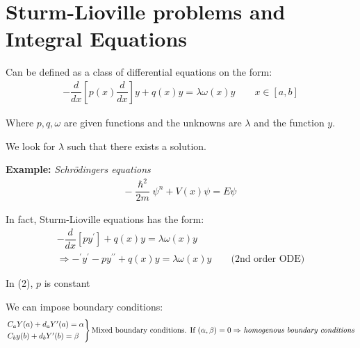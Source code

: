 \section{Sturm-Lioville problems and Integral Equations}\par
\noindent Can be defined as a class of differential equations on the form:
\begin{equation*}
  \begin{gathered}
    -\dfrac{d}{dx}\left[p(x)\dfrac{d}{dx}\right]y+q(x)y=\lambda\omega(x)y\qquad x\in [a,b]
  \end{gathered}
\end{equation*}\par
\noindent Where $p,q,\omega$ are given functions and the unknowns are $\lambda$ and the function $y$.
\par\bigskip
\noindent We look for $\lambda$ such that there exists a solution.
\par\bigskip
\noindent\textbf{Example:} \textit{Schrödingers equations}
\begin{equation}
  \begin{gathered}
    -\dfrac{\hslash^2}{2m}\psi^n+V(x)\psi = E\psi
  \end{gathered}
\end{equation}\par
\noindent In fact, Sturm-Lioville equations has the form:
\begin{equation*}
  \begin{gathered}
    -\dfrac{d}{dx}[py^{\prime}]+q(x)y=\lambda\omega(x)y\\
    \Rightarrow -^{\prime}y^{\prime}-py^{\prime\prime}+q(x)y = \lambda\omega(x)y\qquad\text{(2nd order ODE)}
  \end{gathered}
\end{equation*}\par
\noindent In (2), $p$ is constant
\par\bigskip
\noindent We can impose boundary conditions:
\begin{equation*}
  \begin{gathered}
    \begin{rcases*}
      C_aY(a) + d_aY^{\prime}(a) = \alpha\\
      C_by(b)+d_bY^{\prime}(b) = \beta
    \end{rcases*}\text{Mixed boundary conditions. If $(\alpha,\beta) = 0\Rightarrow$ \textit{homogenous boundary conditions}}
  \end{gathered}
\end{equation*}
